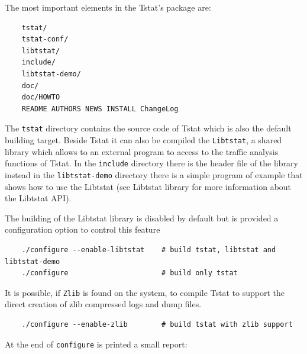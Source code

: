 \documentclass[11pt]{article}
\begin{document}
The most important elements in the Tstat's package are:

\begin{small}\begin{verbatim}
    tstat/
    tstat-conf/
    libtstat/
    include/
    libtstat-demo/
    doc/ 
    doc/HOWTO
    README AUTHORS NEWS INSTALL ChangeLog
\end{verbatim}\end{small} \noindent
The \texttt{tstat} directory contains the source code of Tstat which
is also the default building target. Beside Tstat it can also be compiled
the \texttt{Libtstat}, a shared library which allows to an external program to access 
to the traffic analysis functions of Tstat. In the \texttt{include} directory there is the
header file of the library instead in the \texttt{libtstat-demo} directory there is a simple 
program of example that shows how to use the Libtstat 
(see \textsf{Libtstat library} for more information about the Libtstat API).



The building of the Libtstat library is disabled by default but is provided
a configuration option to control this feature

\begin{small}\begin{verbatim}
    ./configure --enable-libtstat    # build tstat, libtstat and libtstat-demo
    ./configure                      # build only tstat
\end{verbatim}\end{small} \noindent
It is possible, if \texttt{Zlib} is found on the system, to compile Tstat to support the
direct creation of zlib compressed logs and dump files.

\begin{small}\begin{verbatim}
    ./configure --enable-zlib        # build tstat with zlib support
\end{verbatim}\end{small} \noindent
At the end of \texttt{configure} is printed a small report:
\end{document}
